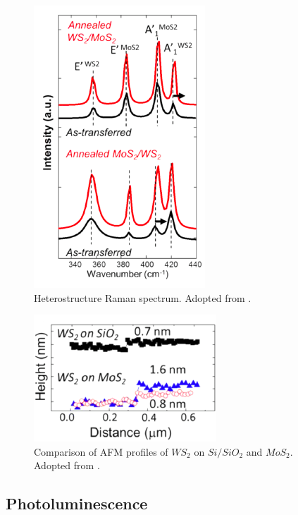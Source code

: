 \begin{figure}[h]
	\begin{center}
		\includegraphics[scale=0.7]{Heterostructures/HeterostructureRamanSpectrumIntro.png}
		\caption{Heterostructure Raman spectrum. Adopted from \cite{Tongay2014}.}
		\label{fig:HeterostructureRamanSpectrumIntro}
	\end{center}
\end{figure}

\begin{figure}[h]
	\begin{center}
		\includegraphics[scale=1]{Heterostructures/HeterostructureAFMProfile.png}
		\caption{Comparison of AFM profiles of $WS_2$ on $Si/SiO_2$ and $MoS_2$. Adopted from \cite{Tongay2014}.}
		\label{fig:HeterostructureAFMProfile}
	\end{center}
\end{figure}


\subsection{Photoluminescence}

